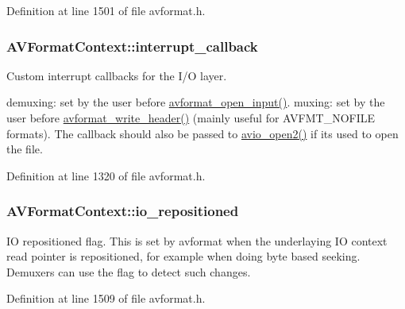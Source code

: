 Definition at line 1501 of file avformat.\+h.

\subsubsection[{\texorpdfstring{interrupt\+\_\+callback}{interrupt_callback}}]{ A\+V\+Format\+Context\+::interrupt\+\_\+callback}\hypertarget{struct_a_v_format_context_a5b37acfe4024d92ee510064e80920b40}{}\label{struct_a_v_format_context_a5b37acfe4024d92ee510064e80920b40}
Custom interrupt callbacks for the I/O layer.

demuxing\+: set by the user before \hyperlink{group__lavf__decoding_ga10a404346c646e4ab58f4ed798baca32}{avformat\+\_\+open\+\_\+input()}. muxing\+: set by the user before \hyperlink{group__lavf__encoding_ga78d4e734fecb1d2385536e6dd5b7b9f5}{avformat\+\_\+write\+\_\+header()} (mainly useful for A\+V\+F\+M\+T\+\_\+\+N\+O\+F\+I\+LE formats). The callback should also be passed to \hyperlink{avio_8h_ade8a63980569494c99593ebf0d1e891b}{avio\+\_\+open2()} if it\textquotesingle{}s used to open the file. 

Definition at line 1320 of file avformat.\+h.

\subsubsection[{\texorpdfstring{io\+\_\+repositioned}{io_repositioned}}]{ A\+V\+Format\+Context\+::io\+\_\+repositioned}\hypertarget{struct_a_v_format_context_a45afe89c377463a1b9446ac94b3c513b}{}\label{struct_a_v_format_context_a45afe89c377463a1b9446ac94b3c513b}
IO repositioned flag. This is set by avformat when the underlaying IO context read pointer is repositioned, for example when doing byte based seeking. Demuxers can use the flag to detect such changes. 

Definition at line 1509 of file avformat.\+h.

